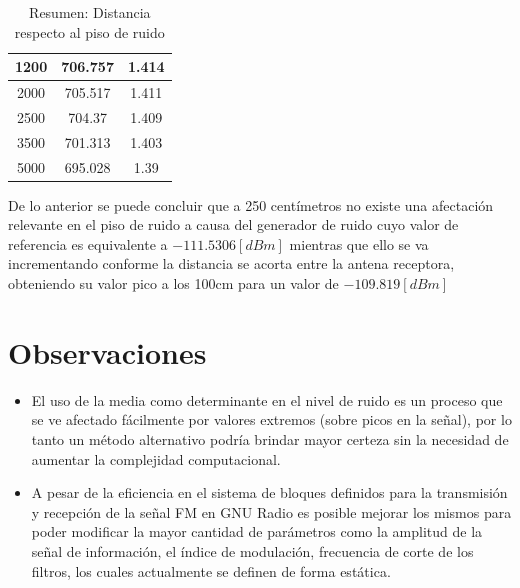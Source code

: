 \documentclass[conference]{IEEEtran}
\begin{document}
\begin{table}[]
\begin{tabular}{|ccc|}
			\multicolumn{1}{|c|}{1200}            & \multicolumn{1}{c|}{706.757}              & 1.414                \\ \hline
			\multicolumn{1}{|c|}{2000}            & \multicolumn{1}{c|}{705.517}              & 1.411                \\ \hline
			\multicolumn{1}{|c|}{2500}            & \multicolumn{1}{c|}{704.37}               & 1.409                \\ \hline
			\multicolumn{1}{|c|}{3500}            & \multicolumn{1}{c|}{701.313}              & 1.403                \\ \hline
			\multicolumn{1}{|c|}{5000}            & \multicolumn{1}{c|}{695.028}              & 1.39                 \\ \hline
		\end{tabular}
		\caption{Resumen: Distancia respecto al piso de ruido}
		\label{tab:resumen-piso-ruido}
	\end{table}
	
	De lo anterior se puede concluir que a 250 centímetros no existe una afectación relevante en el piso de ruido a causa del generador de ruido cuyo valor de referencia es equivalente a $-111.5306 [dBm]$ mientras que ello se va incrementando conforme la distancia se acorta entre la antena receptora, obteniendo su valor pico a los 100cm para un valor de $-109.819 [dBm]$
	
	\section{Observaciones}
	
	\begin{itemize}
		\item El uso de la media como determinante en el nivel de ruido es un proceso que se ve afectado fácilmente por valores extremos (sobre picos en la señal), por lo tanto un método alternativo podría brindar mayor certeza sin la necesidad de aumentar la complejidad computacional.
		\item A pesar de la eficiencia en el sistema de bloques definidos para la transmisión y recepción de la señal FM en GNU Radio es posible mejorar los mismos para poder modificar la mayor cantidad de parámetros como la amplitud de la señal de información, el índice de modulación, frecuencia de corte de los filtros, los cuales actualmente se definen de forma estática.
	\end{itemize}
	
	
	
	
	
\end{document}
